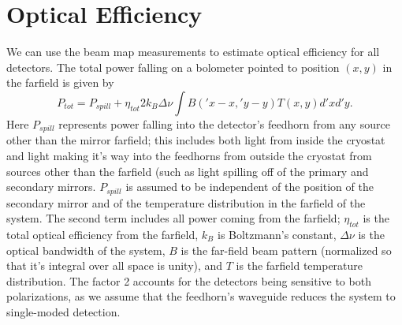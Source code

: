 \section{Optical Efficiency} \label{sec:ch8-opt-eff}

We can use the beam map measurements to estimate optical efficiency for all detectors.
The total power falling on a bolometer pointed to position $(x,y)$ in the farfield is given by 
\begin{equation}
  P_{tot} = P_{spill} + \eta_{tot} 2 k_B \Delta \nu \int B(\prime{x} -x, \prime{y} - y) T(x,y) d\prime{x} d\prime{y}.
\end{equation}
Here $P_{spill}$ represents power falling into the detector's feedhorn from any source other than the mirror farfield; this includes both light from inside the cryostat and light making it's way into the feedhorns from outside the cryostat from sources other than the farfield (such as light spilling off of the primary and secondary mirrors.
$P_{spill}$ is assumed to be independent of the position of the secondary mirror and of the temperature distribution in the farfield of the system.
The second term includes all power coming from the farfield; $\eta_{tot}$ is the total optical efficiency from the farfield, $k_B$ is Boltzmann's constant, $\Delta \nu$ is the optical bandwidth of the system, $B$ is the far-field beam pattern (normalized so that it's integral over all space is unity), and $T$ is the farfield temperature distribution.
The factor 2 accounts for the detectors being sensitive to both polarizations, as we assume that the feedhorn's waveguide reduces the system to single-moded detection.

